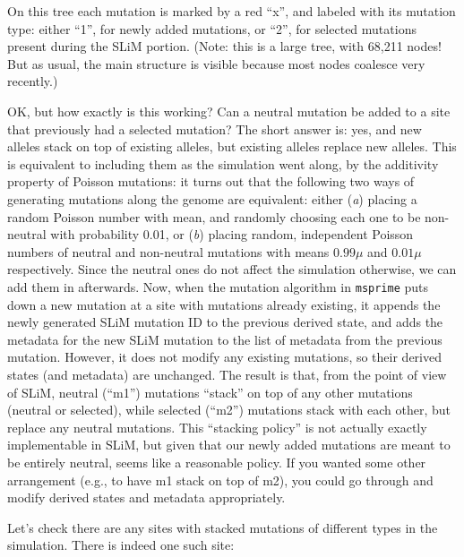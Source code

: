 \documentclass[12pt]{article}
\newcommand{\msprime}[0]{\texttt{msprime}\xspace}
\begin{document}

On this tree each mutation is marked by a red “x”,
and labeled with its mutation type: either “1”, for newly added mutations, or “2”, for selected mutations present during the SLiM portion.
(Note: this is a large tree, with 68,211 nodes! But as usual, the main structure is visible because most nodes coalesce very recently.) %

OK, but how exactly is this working?
Can a neutral mutation be added to a site that previously had a selected mutation?
The short answer is: yes, and new alleles stack on top of existing alleles,
but existing alleles replace new alleles.
This is equivalent to including them as the simulation went along,
by the additivity property of Poisson mutations:
it turns out that the following two ways of generating mutations along the genome are equivalent:
either (\textit{a}) placing a random Poisson number with mean,
and randomly choosing each one to be non-neutral with probability 0.01, or
(\textit{b}) placing random, independent Poisson numbers of neutral and non-neutral mutations with means $0.99 \mu$ and $0.01 \mu$ respectively.
Since the neutral ones do not affect the simulation otherwise, we can add them in afterwards.
Now, when the mutation algorithm in \msprime puts down a new mutation at a site with mutations already existing,
it appends the newly generated SLiM mutation ID to the previous derived state,
and adds the metadata for the new SLiM mutation to the list of metadata from the previous mutation.
However, it does not modify any existing mutations, so their derived states (and metadata) are unchanged.
The result is that, from the point of view of SLiM, neutral (“m1”) mutations “stack” on top of any other mutations (neutral or selected), while selected (“m2”) mutations stack with each other, but replace any neutral mutations.
This “stacking policy” is not actually exactly implementable in SLiM,
but given that our newly added mutations are meant to be entirely neutral,
seems like a reasonable policy.
If you wanted some other arrangement (e.g., to have m1 stack on top of m2),
you could go through and modify derived states and metadata appropriately.

Let’s check there are any sites with stacked mutations of different types in the simulation. There is indeed one such site:
\end{document}

